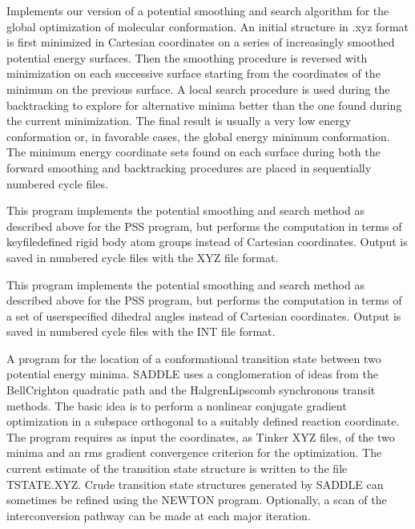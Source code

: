 \documentclass[letterpaper,11pt,english]{sphinxmanual}
\begin{document}

Implements our version of a potential smoothing and search algorithm for the global optimization of molecular conformation. An initial structure in .xyz format is first minimized in Cartesian coordinates on a series of increasingly smoothed potential energy surfaces. Then the smoothing procedure is reversed with minimization on each successive surface starting from the coordinates of the minimum on the previous surface. A local search procedure is used during the backtracking to explore for alternative minima better than the one found during the current minimization. The final result is usually a very low energy conformation or, in favorable cases, the global energy minimum conformation. The minimum energy coordinate sets found on each surface during both the forward smoothing and backtracking procedures are placed in sequentially numbered cycle files.


This program implements the potential smoothing and search method as described above for the PSS program, but performs the computation in terms of keyfile\sphinxhyphen{}defined rigid body atom groups instead of Cartesian coordinates. Output is saved in numbered cycle files with the XYZ file format.


This program implements the potential smoothing and search method as described above for the PSS program, but performs the computation in terms of a set of user\sphinxhyphen{}specified dihedral angles instead of Cartesian coordinates. Output is saved in numbered cycle files with the INT file format.


A program for the location of a conformational transition state between two potential energy minima. SADDLE uses a conglomeration of ideas from the Bell\sphinxhyphen{}Crighton quadratic path and the Halgren\sphinxhyphen{}Lipscomb synchronous transit methods. The basic idea is to perform a nonlinear conjugate gradient optimization in a subspace orthogonal to a suitably defined reaction coordinate. The program requires as input the coordinates, as Tinker XYZ files, of the two minima and an rms gradient convergence criterion for the optimization. The current estimate of the transition state structure is written to the file TSTATE.XYZ. Crude transition state structures generated by SADDLE can sometimes be refined using the NEWTON program. Optionally, a scan of the interconversion pathway can be made at each major iteration.
\end{document}
